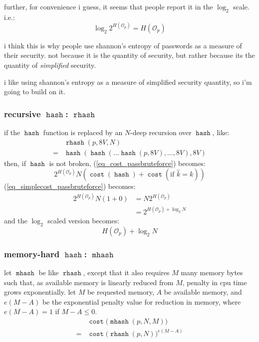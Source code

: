 \documentclass[twocolumn]{article}
\DeclareMathOperator{\hash}{\mathtt{hash}}
\DeclareMathOperator{\rhash}{\mathtt{rhash}}
\DeclareMathOperator{\mhash}{\mathtt{mhash}}
\DeclareMathOperator{\cost}{\mathtt{cost}}
\begin{document}
further, for convenience i guess, it seems that people report it in the
$\log_2$ scale.  i.e.:
\begin{equation}\label{eq_pass_entropy}
    \log_2 2^{H(\mathcal{O}_p)} = H(\mathcal{O}_p)
\end{equation}

i think this is why people use shannon's entropy of passwords as a measure
of their security.  not because it is the quantity of security, but rather
because its the quantity of \emph{simplified} security.

i like using shannon's entropy as a measure of simplified security
quantity, so i'm going to build on it.

\subsubsection{recursive $\hash$: $\rhash$}
if the $\hash$ function is replaced by an $N$-deep recursion over $\hash$,
like:
\[
    \begin{split}
        & \rhash(p, 8V, N) \\
    ={} &  \hash(\hash(\ldots\hash(p, 8V), \ldots, 8V), 8V)
    \end{split}
\]
then, if $\hash$ is not broken,  (\ref{eq_cost_passbruteforce}) becomes:
\begin{equation}\label{eq_cost_passbruteforce_N}
    2^{H(\mathcal{O}_p)} N \left(
        \cost(\hash) + \cost(\text{if } \hat k = k)
    \right)
\end{equation}
(\ref{eq_simplecost_passbruteforce}) becomes:
\begin{equation}\label{eq_simplecost_passbruteforce_N}
    \begin{split}
    2^{H(\mathcal{O}_p)} N (1+0) &= N2^{H(\mathcal{O}_p)} \\
                  &= 2^{H(\mathcal{O}_p) + \log_2 N}
    \end{split}
\end{equation}
and the $\log_2$ scaled version becomes:
\begin{equation}\label{eq_pass_cavemanentropy_rhash}
    H(\mathcal{O}_p) + \log_2 N
\end{equation}

\subsubsection{memory-hard $\hash$: $\mhash$}
let $\mhash$ be like $\rhash$, except that it also requires $M$ many memory
bytes such that, as available memory is linearly reduced from $M$, penalty
in cpu time grows exponentially.  let $M$ be requested memory, $A$ be
available memory, and $e(M - A)$ be the exponential penalty value for
reduction in memory, where $e(M - A) = 1$ if $M-A \le 0$.
\begin{equation}
    \begin{split}
        & \cost\Big(\mhash(p, N, M)\Big) \\
    ={} & \cost\Big(\rhash(p, N)\Big)^{e(M-A)}
    \end{split}
\end{equation}
\end{document}
